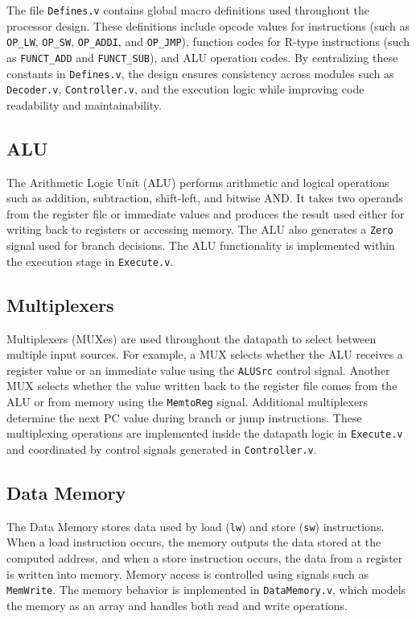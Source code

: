 \documentclass{article}
\begin{document}
The file \texttt{Defines.v} contains global macro definitions used throughout the processor design. These definitions include opcode values for instructions (such as \texttt{OP\_LW}, \texttt{OP\_SW}, \texttt{OP\_ADDI}, and \texttt{OP\_JMP}), function codes for R-type instructions (such as \texttt{FUNCT\_ADD} and \texttt{FUNCT\_SUB}), and ALU operation codes. By centralizing these constants in \texttt{Defines.v}, the design ensures consistency across modules such as \texttt{Decoder.v}, \texttt{Controller.v}, and the execution logic while improving code readability and maintainability.


\subsection{ALU}

The Arithmetic Logic Unit (ALU) performs arithmetic and logical operations such as addition, subtraction, shift-left, and bitwise AND. It takes two operands from the register file or immediate values and produces the result used either for writing back to registers or accessing memory. The ALU also generates a \texttt{Zero} signal used for branch decisions. The ALU functionality is implemented within the execution stage in \texttt{Execute.v}.

\subsection{Multiplexers}

Multiplexers (MUXes) are used throughout the datapath to select between multiple input sources. For example, a MUX selects whether the ALU receives a register value or an immediate value using the \texttt{ALUSrc} control signal. Another MUX selects whether the value written back to the register file comes from the ALU or from memory using the \texttt{MemtoReg} signal. Additional multiplexers determine the next PC value during branch or jump instructions. These multiplexing operations are implemented inside the datapath logic in \texttt{Execute.v} and coordinated by control signals generated in \texttt{Controller.v}.

\subsection{Data Memory}

The Data Memory stores data used by load (\texttt{lw}) and store (\texttt{sw}) instructions. When a load instruction occurs, the memory outputs the data stored at the computed address, and when a store instruction occurs, the data from a register is written into memory. Memory access is controlled using signals such as \texttt{MemWrite}. The memory behavior is implemented in \texttt{DataMemory.v}, which models the memory as an array and handles both read and write operations.
\end{document}
